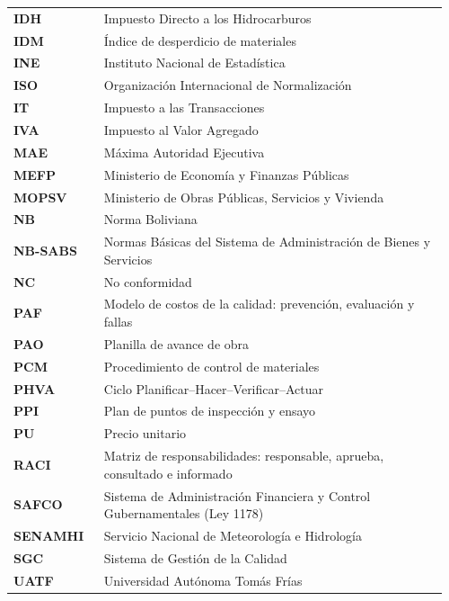 \begin{longtable}{@{}P{0.20\linewidth}P{0.76\linewidth}@{}}
\textbf{IDH}     & Impuesto Directo a los Hidrocarburos \\
\textbf{IDM}     & Índice de desperdicio de materiales \\
\textbf{INE}     & Instituto Nacional de Estadística \\
\textbf{ISO}     & Organización Internacional de Normalización \\
\textbf{IT}      & Impuesto a las Transacciones \\
\textbf{IVA}     & Impuesto al Valor Agregado \\
\textbf{MAE}     & Máxima Autoridad Ejecutiva \\
\textbf{MEFP}    & Ministerio de Economía y Finanzas Públicas \\
\textbf{MOPSV}   & Ministerio de Obras Públicas, Servicios y Vivienda \\
\textbf{NB}      & Norma Boliviana \\
\textbf{NB-SABS} & Normas Básicas del Sistema de Administración de Bienes y Servicios \\
\textbf{NC}      & No conformidad \\
\textbf{PAF}     & Modelo de costos de la calidad: prevención, evaluación y fallas \\
\textbf{PAO}     & Planilla de avance de obra \\
\textbf{PCM}     & Procedimiento de control de materiales \\
\textbf{PHVA}    & Ciclo Planificar--Hacer--Verificar--Actuar \\
\textbf{PPI}     & Plan de puntos de inspección y ensayo \\
\textbf{PU}      & Precio unitario \\
\textbf{RACI}    & Matriz de responsabilidades: responsable, aprueba, consultado e informado \\
\textbf{SAFCO}   & Sistema de Administración Financiera y Control Gubernamentales (Ley 1178) \\
\textbf{SENAMHI} & Servicio Nacional de Meteorología e Hidrología \\
\textbf{SGC}     & Sistema de Gestión de la Calidad \\
\textbf{UATF}    & Universidad Autónoma Tomás Frías \\
\end{longtable}
\endgroup
\setcounter{table}{0} %
